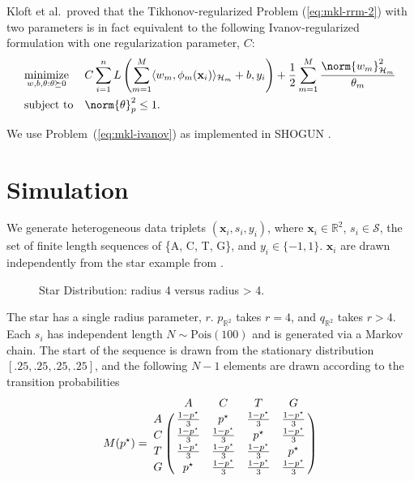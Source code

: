 Kloft et al.\ proved that the Tikhonov-regularized Problem (\ref{eq:mkl-rrm-2})
with two parameters is in fact equivalent to the following Ivanov-regularized
formulation with one regularization parameter, $C$:
\begin{equation}
\label{eq:mkl-ivanov}
\begin{aligned}
& \underset{w, b, \theta : \theta \succeq 0}{\text{minimize}}
& & C \sum_{i=1}^n L \left (\sum_{m=1}^M \langle w_m, \phi_m({\mathbf x}_i) \rangle_{\mathcal{H}_m} + b, y_i
\right) + \frac{1}{2} \sum_{m=1}^M \frac{\norm{w_m}_{\mathcal{H}_m}^2}{\theta_m} \\
& \text{subject to}
& & \norm{\theta}_p^2 \leq 1.
\end{aligned}
\end{equation}

We use Problem~(\ref{eq:mkl-ivanov}) as implemented in SHOGUN \cite{sonnenburg2010shogun}.

\section{Simulation}
We generate heterogeneous data triplets $(\mathbf{x}_i, s_i, y_i)$, where
$\mathbf{x}_i \in \mathbb{R}^2$, $s_i \in \mathcal{S}$, the set of finite
length sequences of \{A, C, T, G\}, and $y_i \in \{-1, 1\}$.
$\mathbf{x}_i$ are drawn independently from the star example from \cite{sonnenburg2006large}.
\begin{figure}
  \begin{center}
    \resizebox{14.0cm}{!}{
      
    }
  \end{center}
\caption{Star Distribution: radius 4 versus radius > 4.}
\label{fig:star}
\end{figure}

The star has a single radius parameter, $r$.  $p_{\mathbb{R}^2}$ takes
$r = 4$, and $q_{\mathbb{R}^2}$ takes $r > 4$.  Each $s_i$ has
independent length $N \sim \text{Pois}(100)$ and is generated via a
Markov chain.  The start of the sequence is drawn from the stationary
distribution $[.25, .25, .25, .25]$, and the following $N-1$ elements
are drawn according to the transition probabilities
\begin{equation*}
  M(p^{\star}) = \bordermatrix{
    ~ & A & C & T & G \cr
    A & \frac{1-p^{\star}}{3} & p^{\star} & \frac{1-p^{\star}}{3} & \frac{1-p^{\star}}{3} \cr
    C & \frac{1-p^{\star}}{3} & \frac{1-p^{\star}}{3} & p^{\star} & \frac{1-p^{\star}}{3} \cr
    T & \frac{1-p^{\star}}{3} & \frac{1-p^{\star}}{3} & \frac{1-p^{\star}}{3} & p^{\star} \cr
    G & p^{\star} & \frac{1-p^{\star}}{3} & \frac{1-p^{\star}}{3} & \frac{1-p^{\star}}{3} \cr
  }
\end{equation*}

